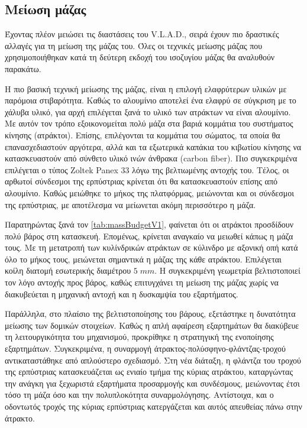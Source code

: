 \subsection{Μείωση μάζας}
Έχοντας πλέον μειώσει τις διαστάσεις του V.L.A.D., σειρά έχουν πιο δραστικές αλλαγές για τη μείωση της μάζας του. Όλες οι τεχνικές μείωσης μάζας που χρησιμοποιήθηκαν κατά τη δεύτερη εκδοχή του ισοζυγίου μάζας θα αναλυθούν παρακάτω.
\par Η πιο βασική τεχνική μείωσης της μάζας, είναι η επιλογή ελαφρύτερων υλικών με παρόμοια στιβαρότητα. Καθώς το αλουμίνιο αποτελεί ένα ελαφρύ σε σύγκριση με το χάλυβα υλικό, για αρχή επιλέγεται ξανά το υλικό των ατράκτων να είναι αλουμίνιο. Με αυτόν τον τρόπο εξοικονομείται πολύ μάζα στα βαριά κομμάτια του συστήματος κίνησης (ατράκτοι). Επίσης, επιλέγονται τα κομμάτια του σώματος, τα οποία θα επανασχεδιαστούν αργότερα, αλλά και τα εξωτερικά καπάκια του κιβωτίου κίνησης να κατασκευαστούν από σύνθετο υλικό ινών άνθρακα (carbon fiber). Πιο συγκεκριμένα επιλέγεται ο τύπος Zoltek Panex 33 λόγω της βελτιωμένης αντοχής του. Τέλος, οι αρθωτοί σύνδεσμοι της ερπύστριας κρίνεται ότι θα κατασκευαστούν επίσης από αλουμίνιο. Καθώς μειώθηκε το μήκος της πλατφόρμας, μειώνονται και οι σύνδεσμοι της ερπύστριας, με αποτέλεσμα να μείωνεται ακόμη περισσότερο η μάζα.
\par Παρατηρώντας ξανά τον \ref{tab:massBudgetV1}, φαίνεται ότι οι ατράκτοι προσδίδουν πολύ βάρος στη κατασκευή. Επομένως, κρίνεται αναγκαίο να μειωθεί κάπως η μάζα τους. Με τη μετατροπή των κυλίνδρικών ατράκτων σε κύλινδρο με αξονική οπή κατά όλο το μήκος τους, μειώνεται σημαντικά η μάζας της κάθε ατράκτου. Επιλέγεται κοίλη διατομή εσωτερικής διαμέτρου $5\; mm$. Η συγκεκριμένη γεωμετρία βελτιστοποιεί τον λόγο αντοχής προς βάρος, καθώς επιτυγχάνει τη μείωση της μάζας χωρίς να διακυβεύεται η μηχανική αντοχή και η δυσκαμψία του εξαρτήματος. 
\par Παράλληλα, στο πλαίσιο της βελτιστοποίησης του βάρους, εξετάστηκε η δυνατότητα μείωσης των δομικών στοιχείων. Καθώς η απλή αφαίρεση εξαρτημάτων θα διακύβευε τη λειτουργικότητα του μηχανισμού, προκρίθηκε η στρατηγική της ενοποίησης εξαρτημάτων. Συγκεκριμένα, η συναρμογή άτρακτος-πολύσφηνο-φλάντζας-τροχού αντικαταστάθηκε από απλούστερο σχεδιασμό. Στη νέα διάταξη, η φλάντζα του τροχού της ερπύστριας κατασκευάζεται ως ενιαίο τμήμα της κύριας ατράκτου, καταργώντας την ανάγκη για ξεχωριστά εξαρτήματα προσαρμογής και συνδέσμους, μειώνοντας έτσι τόσο τη μάζα όσο και την πολυπλοκότητα συναρμολόγησης. Αντίστοιχα, και ο οδοντωτός τροχός της κύριας ερπύστριας κατεργάζεται και αυτός απευθείας πάνω στην άτρακτο.

